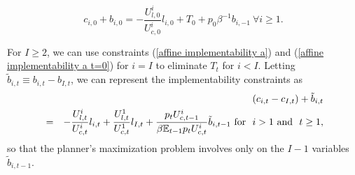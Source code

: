 \documentclass[thmsb,11pt]{article}
\begin{document}
\begin{equation}
\label{affine implementability a t=0}
c_{i,0}+b_{i,0}=-\frac{U_{l,0}^{i}}{U_{c,0}^{i}}l_{i,0}+T_{0}+
p_0 \beta^{-1}b_{i,-1}\ \forall i \geq 1.
\end{equation}

\noindent For $I\geq 2$, we can use constraints (\ref{affine implementability
a}) and (\ref{affine implementability
a t=0}) for  $i=I$ to eliminate $T_{t}$ for $i < I$. Letting $\tilde{b}%
_{i,t}\equiv b_{i,t}-b_{I,t}$, we can represent the implementability constraints
as
\begin{eqnarray}
\label{affine implementability b}
&&\left( c_{i,t}-c_{I,t}\right) +\tilde{b}_{i,t}\\
&=&-\frac{U_{l,t}^{i}}{U_{c,t}^{i}}l_{i,t}+\frac{U^1_{l,t}}{U^1_{c,t}}l_{I,t} +\frac{p_tU_{c,t-1}^{i}}{\beta \mathbb{E}%
_{t-1}p_tU_{c,t}^{i}}\tilde{b}_{i,t-1}\ \text{\rm for \ }i>1 \ \text{\rm and \ } t\geq 1,  \notag
\end{eqnarray}
so that  the planner's
maximization problem involves only on the $I-1$ variables $\tilde{b}_{i,t-1}.$
\end{document}
